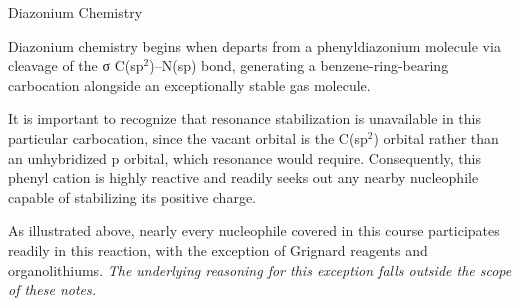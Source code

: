     \begin{core}[label=core:diazonium_chem]{Diazonium Chemistry}

      Diazonium chemistry begins when  departs from a phenyldiazonium molecule via cleavage of the σ C(sp$^2$)--N(sp) bond, generating a benzene-ring-bearing carbocation alongside an exceptionally stable  gas molecule.


      It is important to recognize that resonance stabilization is unavailable in this particular carbocation, since the vacant orbital is the C(sp$^2$) orbital rather than an unhybridized p orbital, which resonance would require. Consequently, this phenyl cation is highly reactive and readily seeks out any nearby nucleophile capable of stabilizing its positive charge.


      As illustrated above, nearly every nucleophile covered in this course participates readily in this reaction, with the exception of Grignard reagents and organolithiums. \textit{The underlying reasoning for this exception falls outside the scope of these notes.}


\end{core}
